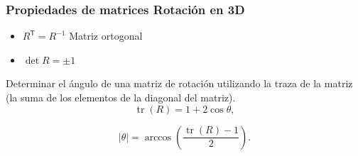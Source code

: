 \begin{frame}
\begin{equation*}
    \end{equation*}

\end{frame}


\begin{frame}
    \frametitle{Propiedades de matrices Rotación en 3D}
    \small
    \begin{itemize}
        \item ${\displaystyle R^{\mathsf {T}}=R^{-1}}$ Matriz ortogonal
        \item $\det R = \pm 1$
    \end{itemize}

    Determinar el ángulo de una matriz de rotación utilizando la traza de la matriz (la suma de los elementos de la diagonal del matriz).
    \begin{equation*}
        {\displaystyle \operatorname {tr} (R)=1+2\cos \theta ,}
    \end{equation*}

    \begin{equation*}
        {\displaystyle |\theta |=\arccos \left({\frac {\operatorname {tr} (R)-1}{2}}\right).}
    \end{equation*}

\end{frame}

